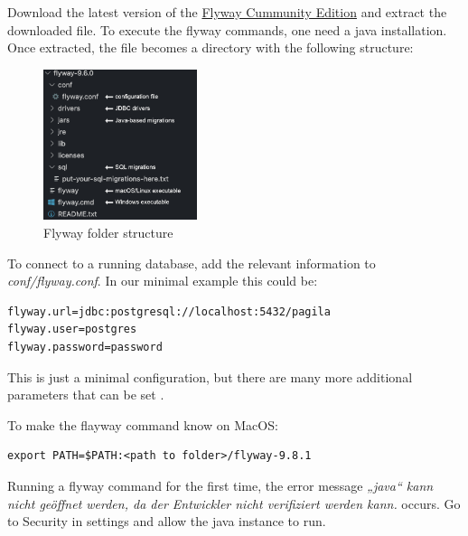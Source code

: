 \newpage
{}%
Download the latest version of the \href{https://flywaydb.org/download/community}{Flyway Cummunity Edition} and extract the downloaded file. To execute the flyway commands, one need a java installation.
Once extracted, the file becomes a directory with the following structure:

\begin{figure}[H]
    \centering
    \includegraphics[width=0.4\textwidth]{./chapters/intro_flyway/images/flyway_folder_structure}
   \caption[Flyway folder structure - Source: Own illustration]{Flyway folder structure}
    \label{fig:flyway_folder_structure}
\end{figure}


%
To connect to a running database, add the relevant information to \textit{conf/flyway.conf}.
In our minimal example this could be:

\begin{lstlisting}[caption=Minimal configuration]
flyway.url=jdbc:postgresql://localhost:5432/pagila
flyway.user=postgres
flyway.password=password
\end{lstlisting}

This is just a minimal configuration, but there are many more additional parameters that can be set \cite{FlywayConfiguration}.


%
To make the flayway command know on MacOS:
\begin{lstlisting}
export PATH=$PATH:<path to folder>/flyway-9.8.1
\end{lstlisting}
Running a flyway command for the first time, the error message \textit{„java“ kann nicht geöffnet werden, da der Entwickler nicht verifiziert werden kann.} occurs. Go to Security in settings and allow the java instance to run.

\newpage